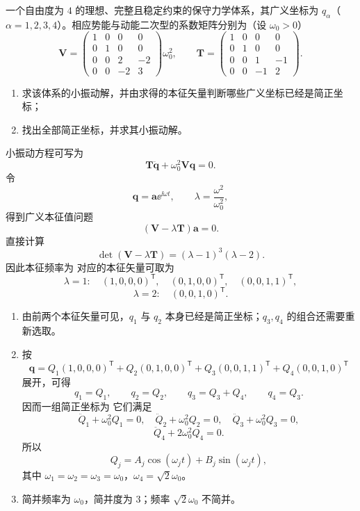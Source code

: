 \begin{question}[四自由度系统的小振动]
一个自由度为 $4$ 的理想、完整且稳定约束的保守力学体系，其广义坐标为 $q_\alpha$（$\alpha=1,2,3,4$）。相应势能与动能二次型的系数矩阵分别为（设 $\omega_0>0$）
\[
  \mathbf{V}=\begin{pmatrix}
    1&0&0&0\\
    0&1&0&0\\
    0&0&2&-2\\
    0&0&-2&3
  \end{pmatrix}\omega_0^2,
  \qquad
  \mathbf{T}=\begin{pmatrix}
    1&0&0&0\\
    0&1&0&0\\
    0&0&1&-1\\
    0&0&-1&2
  \end{pmatrix}.
\]
\begin{enumerate}
  \item 求该体系的小振动解，并由求得的本征矢量判断哪些广义坐标已经是简正坐标；
  \item 找出全部简正坐标，并求其小振动解。
\end{enumerate}

\begin{solution}
小振动方程可写为
\[
  \mathbf T\ddot{\boldsymbol q}+\omega_0^2\mathbf V\boldsymbol q=0.
\]
令
\[
  \boldsymbol q=\boldsymbol a\ee^{\ii\omega t},
  \qquad
  \lambda=\frac{\omega^2}{\omega_0^2},
\]
得到广义本征值问题
\[
  (\mathbf V-\lambda\mathbf T)\boldsymbol a=0.
\]
直接计算
\[
  \det(\mathbf V-\lambda\mathbf T)=(\lambda-1)^3(\lambda-2).
\]
因此本征频率为
对应的本征矢量可取为
\[
  \lambda=1:
  \quad
  (1,0,0,0)^{\mathsf T},\quad
  (0,1,0,0)^{\mathsf T},\quad
  (0,0,1,1)^{\mathsf T},
\]
\[
  \lambda=2:
  \quad
  (0,0,1,0)^{\mathsf T}.
\]
\begin{enumerate}
  \item 由前两个本征矢量可见，$q_1$ 与 $q_2$ 本身已经是简正坐标；$q_3,q_4$ 的组合还需要重新选取。
  \item 按
  \[
    \boldsymbol q=Q_1(1,0,0,0)^{\mathsf T}
    +Q_2(0,1,0,0)^{\mathsf T}
    +Q_3(0,0,1,1)^{\mathsf T}
    +Q_4(0,0,1,0)^{\mathsf T}
  \]
  展开，可得
  \[
    q_1=Q_1,
    \qquad
    q_2=Q_2,
    \qquad
    q_3=Q_3+Q_4,
    \qquad
    q_4=Q_3.
  \]
  因而一组简正坐标为
  它们满足
  \[
    \ddot Q_1+\omega_0^2Q_1=0,
    \quad
    \ddot Q_2+\omega_0^2Q_2=0,
    \quad
    \ddot Q_3+\omega_0^2Q_3=0,
  \]
  \[
    \ddot Q_4+2\omega_0^2Q_4=0.
  \]
  所以
  \[
    Q_j=A_j\cos(\omega_jt)+B_j\sin(\omega_jt),
  \]
  其中 $\omega_1=\omega_2=\omega_3=\omega_0$，$\omega_4=\sqrt2\omega_0$。
  \item 简并频率为 $\omega_0$，简并度为 $3$；频率 $\sqrt2\omega_0$ 不简并。
\end{enumerate}
\end{solution}

\end{question}

